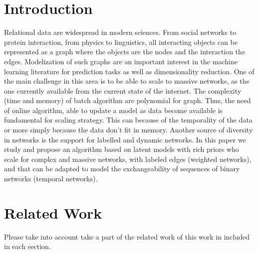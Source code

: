 \section{Introduction}

Relational data are widespread in modern sciences. From social networks to protein interaction, from physics to linguistics, all interacting objects can be represented as a graph where the objects are the nodes and the interaction the edges. Modelization of such graphs are an important interest in the machine learning literature for prediction tasks as well as dimensionality reduction. One of the main challenge in this area is to be able to scale to massive networks, as the one currently available from the current state of the internet. The complexity (time and memory) of batch algorithm are polynomial for graph. Thus, the need of online algorithm, able to update a model as data become available is fundamental for scaling strategy. This can because of the temporality of the data or more simply because the data don't fit in memory. Another source of diversity in networks is the support for labelled and dynamic networks. In this paper we study and propose an algorithm based on latent models with rich priors who scale for complex and massive networks, with labeled edges (weighted networks), and that can be adapted to model the exchangeability of sequences of binary networks (temporal networks).

\section{Related Work}
Please take into account take a part of the related work of this work in included in each section.
